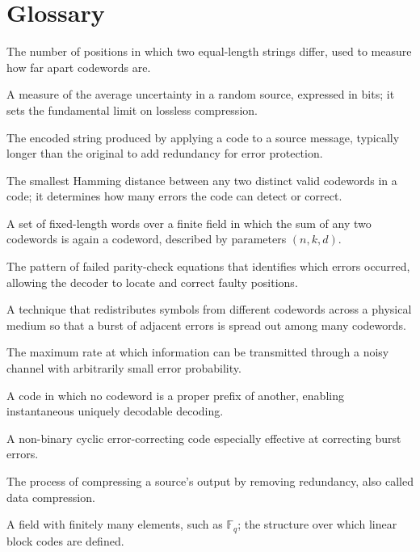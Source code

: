\section*{Glossary}
\begin{description}[leftmargin=*,style=nextline,itemsep=0.3em]
\item[\textbf{Hamming distance.}] The number of positions in which two equal-length strings differ, used to measure how far apart codewords are.
\item[\textbf{Entropy.}] A measure of the average uncertainty in a random source, expressed in bits; it sets the fundamental limit on lossless compression.
\item[\textbf{Codeword.}] The encoded string produced by applying a code to a source message, typically longer than the original to add redundancy for error protection.
\item[\textbf{Minimum distance.}] The smallest Hamming distance between any two distinct valid codewords in a code; it determines how many errors the code can detect or correct.
\item[\textbf{Linear block code.}] A set of fixed-length words over a finite field in which the sum of any two codewords is again a codeword, described by parameters $(n,k,d)$.
\item[\textbf{Syndrome.}] The pattern of failed parity-check equations that identifies which errors occurred, allowing the decoder to locate and correct faulty positions.
\item[\textbf{Interleaving.}] A technique that redistributes symbols from different codewords across a physical medium so that a burst of adjacent errors is spread out among many codewords.
\item[\textbf{Channel capacity.}] The maximum rate at which information can be transmitted through a noisy channel with arbitrarily small error probability.
\item[\textbf{Prefix-free code.}] A code in which no codeword is a proper prefix of another, enabling instantaneous uniquely decodable decoding.
\item[\textbf{Reed-Solomon code.}] A non-binary cyclic error-correcting code especially effective at correcting burst errors.
\item[\textbf{Source coding.}] The process of compressing a source's output by removing redundancy, also called data compression.
\item[\textbf{Finite field.}] A field with finitely many elements, such as $\mathbb{F}_q$; the structure over which linear block codes are defined.
\end{description}

